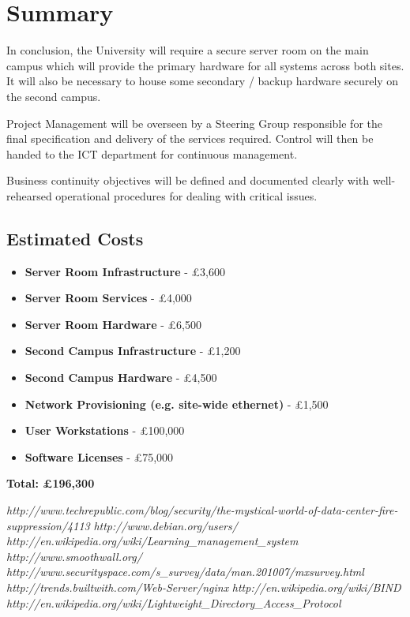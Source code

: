 \documentclass[a4paper, twoside]{article}
\begin{document}
\section{Summary}
In conclusion, the University will require a secure server room on the main
campus which will provide the primary hardware for all systems across both
sites. It will also be necessary to house some secondary / backup hardware
securely on the second campus.

Project Management will be overseen by a Steering Group responsible for the
final specification and delivery of the services required. Control will then be
handed to the ICT department for continuous management.

Business continuity objectives will be defined and documented clearly with
well-rehearsed operational procedures for dealing with critical issues.

\subsection{Estimated Costs}
\begin{itemize}
\item{{\bf Server Room Infrastructure} - £3,600}
\item{{\bf Server Room Services} - £4,000}
\item{{\bf Server Room Hardware} - £6,500}
\item{{\bf Second Campus Infrastructure} - £1,200}
\item{{\bf Second Campus Hardware} - £4,500}
\item{{\bf Network Provisioning (e.g. site-wide ethernet)} - £1,500}
\item{{\bf User Workstations} - £100,000}
\item{{\bf Software Licenses} - £75,000}
\end{itemize}
{\bf Total: £196,300}

\begin{thebibliography}{1}

 {\em
  http://www.techrepublic.com/blog/security/the-mystical-world-of-data-center-fire-suppression/4113}
 {\em http://www.debian.org/users/}
 {\em http://en.wikipedia.org/wiki/Learning\_management\_system}
 {\em http://www.smoothwall.org/}
 {\em http://www.securityspace.com/s\_survey/data/man.201007/mxsurvey.html}
 {\em http://trends.builtwith.com/Web-Server/nginx}
 {\em http://en.wikipedia.org/wiki/BIND}
 {\em http://en.wikipedia.org/wiki/Lightweight\_Directory\_Access\_Protocol}

\end{thebibliography}
\end{document}
